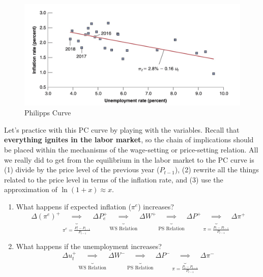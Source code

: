 \documentclass{extarticle}
\begin{document}
\begin{figure}[H]
    \centering 
    \includegraphics[width=0.5\linewidth]{PC.png} 
    \caption{Philipps Curve} 
    \label{fig:derivation} 
\end{figure}

Let's practice with this PC curve by playing with the variables. Recall that \textbf{everything ignites in the labor market}, so the chain of implications should be placed within the mechanisms of the wage-setting or price-setting relation. All we really did to get from the equilibrium in the labor market to the PC curve is (1) divide by the price level of the previous year ($P_{t-1}$), (2) rewrite all the things related to the price level in terms of the inflation rate, and (3) use the approximation of $\ln (1+x) \approx x$.
\begin{enumerate}
    \item What happens if expected inflation ($\pi^e$) increases?
    $$ \Delta (\pi^e)^+ \underbrace{\implies}_{\pi^e = \frac{P^e_t - P_{t-1}}{P_{t-1}}} \Delta P_e^+ \underbrace{\implies}_{\text{WS Relation}} \Delta W^+ \underbrace{\implies}_{\text{PS Relation}} \Delta P^+ \underbrace{\implies}_{\pi = \frac{P_t - P_{t-1}}{P_{t-1}}} \Delta \pi^+$$
    

    \item What happens if the unemployment increases?
    $$\Delta u_t^+ \underbrace{\implies}_{\text{WS Relation}} \Delta W^- \underbrace{\implies}_{\text{PS Relation}} \Delta P^- \underbrace{\implies}_{\pi = \frac{P_t - P_{t-1}}{P_{t-1}}} \Delta \pi^-$$
\end{enumerate}
\end{document}
